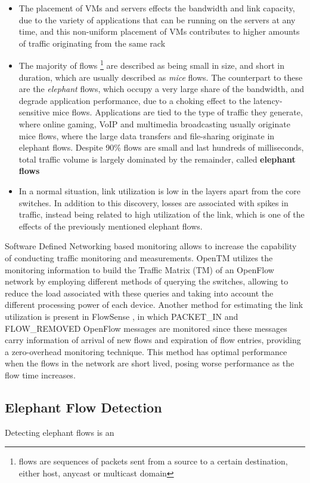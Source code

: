 \begin {itemize}
    \item The placement of VMs and servers effects the bandwidth and link capacity, due to the variety of applications that can be running on the servers at any time,
        and this non-uniform placement of VMs contributes to higher amounts of traffic originating from the same rack
    \item The majority of flows \footnote {flows are sequences of packets sent from a source to a certain destination, either host, anycast or multicast domain} 
        are described as being small in size, and short in duration, which are usually described as \textit {mice} flows. 
        The counterpart to these are the \textit {elephant} flows, which occupy a very large share of the bandwidth, and degrade application performance, due to a
        choking effect to the latency-sensitive mice flows. 
        Applications are tied to the type of traffic they generate, where online gaming, VoIP and multimedia broadcasting usually originate mice flows, where the 
        large data transfers and file-sharing originate in elephant flows. Despite 90\% flows are small and last hundreds of milliseconds, total traffic volume is 
        largely dominated by the remainder, called \textbf{elephant flows} \cite{benson_network_2010}
    \item In a normal situation, link utilization is low in the layers apart from the core switches. In addition to this discovery, losses are associated with 
        spikes in traffic, instead being related to high utilization  of the link, which is one of the effects of the previously mentioned elephant flows.
\end {itemize}

\par Software Defined Networking based monitoring allows to increase the capability of conducting traffic monitoring and measurements. OpenTM 
\cite{opentm_traffic_estimator} utilizes the monitoring information to build the Traffic Matrix (TM) of an OpenFlow network by employing different methods of 
querying the switches, allowing to reduce the load associated with these queries and taking into account the different processing power of each device. Another 
method for estimating the link utilization is present in FlowSense \cite{flowsense_network_utilization}, in which PACKET\_IN and FLOW\_REMOVED OpenFlow messages 
are monitored since these messages carry information of arrival of new flows and expiration of flow entries, providing a zero-overhead monitoring technique. This 
method has optimal performance when the flows in the network are short lived, posing worse performance as the flow time increases.

\subsection {Elephant Flow Detection}

Detecting elephant flows is an 
